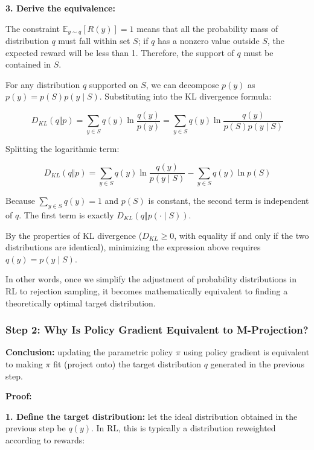\textbf{3. Derive the equivalence:}

The constraint \(\mathbb{E}_{y\sim q}[R(y)]=1\) means that all the probability mass of distribution \(q\) must fall within set \(S\); if \(q\) has a nonzero value outside \(S\), the expected reward will be less than 1. Therefore, the support of \(q\) must be contained in \(S\).

For any distribution \(q\) supported on \(S\), we can decompose \(p(y)\) as \(p(y)=p(S)p(y\mid S)\). Substituting into the KL divergence formula:

\[
D_{KL}(q\Vert p)
= \sum_{y\in S} q(y)\ln\frac{q(y)}{p(y)}
= \sum_{y\in S} q(y)\ln\frac{q(y)}{p(S)p(y\mid S)}
\]

Splitting the logarithmic term:

\[
D_{KL}(q\Vert p)
= \sum_{y\in S} q(y)\ln\frac{q(y)}{p(y\mid S)}
- \sum_{y\in S} q(y)\ln p(S)
\]

Because \(\sum_{y\in S}q(y)=1\) and \(p(S)\) is constant, the second term is independent of \(q\). The first term is exactly \(D_{KL}(q\Vert p(\cdot\mid S))\).

By the properties of KL divergence (\(D_{KL}\ge 0\), with equality if and only if the two distributions are identical), minimizing the expression above requires \(q(y)=p(y\mid S)\).

In other words, once we simplify the adjustment of probability distributions in RL to rejection sampling, it becomes mathematically equivalent to finding a theoretically optimal target distribution.

\hypertarget{step-2-why-is-policy-gradient-equivalent-to-m-projection}{%
\subsubsection{Step 2: Why Is Policy Gradient Equivalent to M-Projection?}\label{step-2-why-is-policy-gradient-equivalent-to-m-projection}}

\textbf{Conclusion:} updating the parametric policy \(\pi\) using policy gradient is equivalent to making \(\pi\) fit (project onto) the target distribution \(q\) generated in the previous step.

\textbf{Proof:}

\textbf{1. Define the target distribution:} let the ideal distribution obtained in the previous step be \(q(y)\). In RL, this is typically a distribution reweighted according to rewards:

